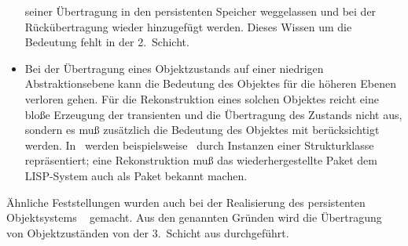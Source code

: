 \begin{itemize}
seiner \"{U}bertragung in den persistenten Speicher weggelassen und bei
der R\"{u}ck\"{u}bertragung wieder hinzugef\"{u}gt werden. Dieses Wissen um die
Bedeutung fehlt in der 2.~Schicht.
%
\item Bei der \"{U}bertragung eines Objektzustands auf einer niedrigen
Abstraktionsebene kann die Bedeutung des Objektes f\"{u}r die h\"{o}heren
Ebenen verloren gehen. F\"{u}r die Rekonstruktion eines solchen Objektes
reicht eine blo\ss{}e Erzeugung der transienten \representation{} und die
\"{U}bertragung des Zustands nicht aus, sondern es mu\ss{} zu\-s\"{a}tz\-lich
die Bedeutung des Objektes mit ber\"{u}cksichtigt werden.  In \lw\ werden
beispielsweise \ durch Instanzen einer
Strukturklasse repr\"{a}sentiert; eine Rekonstruktion mu\ss{} das
wiederhergestellte Paket dem LISP-System auch als Paket bekannt
machen.
%
\end{itemize}
%
\"{A}hnliche Feststellungen wurden auch bei der Realisierung des
persistenten Objektsystems \zeitgeist\ \cite[]{bib:fo88}
gemacht. Aus den genannten Gr\"{u}nden wird die \"{U}bertragung von
Objektzust\"{a}nden von der 3.~Schicht aus durchgef\"{u}hrt.
%
